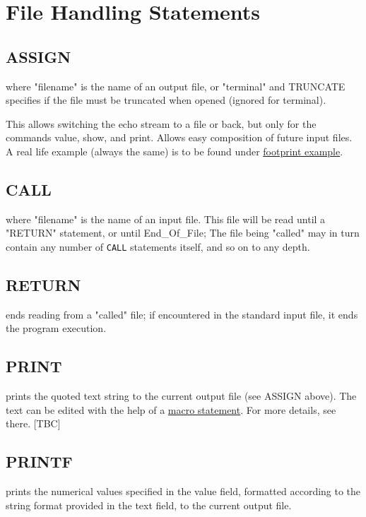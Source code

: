 \chapter{File Handling Statements}
\label{chap:files}

\section{ASSIGN}
\label{sec:assign}

where "filename" is the name of an output file, or "terminal" and
TRUNCATE specifies if the file must be truncated when opened (ignored
for terminal). 

This allows switching the echo stream to a file or back,
but only for the commands value, show, and print. Allows easy
composition of future \madx input files. A real life example (always the
same) is to be found under \href{foot.html}{footprint example}.  

\section{CALL}
\label{sec:call}
where "filename"  is the name of an input file. This file will be read
until a "RETURN" statement, or until End\_Of\_File; The file being
"called" may in turn contain any number of \texttt{CALL} statements
itself, and so on to any depth.  

\section{RETURN}
\label{Sec:return}
ends reading from a "called" file; if encountered in the standard input
file, it ends the program execution.  


\section{PRINT}
\label{sec:print}
prints the quoted text string to the current output file (see ASSIGN
above). The text can be edited with the help of a
\href{special.html#macro}{macro statement}. For more details, see
there. [TBC]  


\section{PRINTF}
\label{sec:printf}
prints the numerical values specified in the value field, formatted
according to the string format provided in the text field, to the
current output file.  

